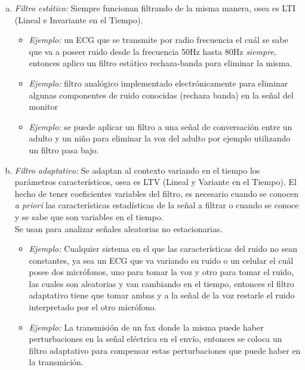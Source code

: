 \documentclass[a4paper,10pt,spanish,oneside]{article}
\begin{document}
\begin{enumerate}[a.]

\item \textit{Filtro estático:} Siempre funcionan filtrando de la misma manera, osea es LTI (Lineal e Invariante en el Tiempo).

\begin{itemize}
\item \textit{Ejemplo:} un ECG que se transmite por radio frecuencia el cuál se sabe que va a poseer ruido desde la frecuencia 50Hz hasta 80Hz \textit{siempre}, entonces aplico un filtro estático rechaza-banda para eliminar la misma.

\item \textit{Ejemplo:} filtro analógico implementado electrónicamente para eliminar algunas componentes de ruido conocidas (rechaza banda) en la señal del monitor

\item \textit{Ejemplo:} se puede aplicar un filtro a una señal de conversación entre un adulto y un niño para eliminar la voz del adulto por ejemplo utilizando un filtro pasa bajo.
\end{itemize}

\item \textit{Filtro adaptativo:} Se adaptan al contexto variando en el tiempo los 				parámetros característicos, osea es LTV (Lineal y Variante en el Tiempo). El hecho de tener coeficientes variables del filtro, es necesario cuando se conocen \textit{a priori} las características estadísticas de la señal a filtrar o cuando se conoce y se sabe que son variables en el tiempo.\\
Se usan para analizar señales aleatorias no estacionarias.

\begin{itemize}
\item \textit{Ejemplo:} Cualquier sistema en el que las características del ruido no sean constantes, ya sea un ECG que va variando su ruido o un celular el cuál posee dos micrófonos, uno para tomar la voz y otro para tomar el ruido, las cuales son aleatorias y van cambiando en el tiempo, entonces el filtro adaptativo tiene que tomar ambas y a la señal de la voz restarle el ruido interpretado por el otro micrófono. 

\item \textit{Ejemplo:} La transmisión de un fax donde la misma puede haber perturbaciones en la señal eléctrica en el envío, entonces se coloca un filtro adaptativo para compensar estas perturbaciones que puede haber en la transmición.


\end{itemize}
\end{enumerate}
\end{document}
